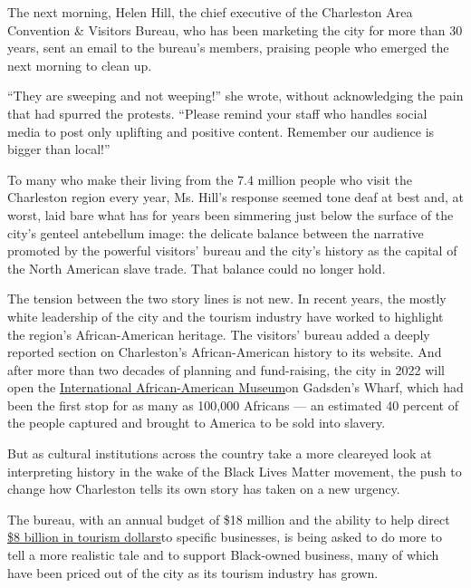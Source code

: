 The next morning, Helen Hill, the chief executive of the Charleston Area
Convention \& Visitors Bureau, who has been marketing the city for more
than 30 years, sent an email to the bureau's members, praising people
who emerged the next morning to clean up.

``They are sweeping and not weeping!'' she wrote, without acknowledging
the pain that had spurred the protests. ``Please remind your staff who
handles social media to post only uplifting and positive content.
Remember our audience is bigger than local!''

To many who make their living from the 7.4 million people who visit the
Charleston region every year, Ms. Hill's response seemed tone deaf at
best and, at worst, laid bare what has for years been simmering just
below the surface of the city's genteel antebellum image: the delicate
balance between the narrative promoted by the powerful visitors' bureau
and the city's history as the capital of the North American slave trade.
That balance could no longer hold.

The tension between the two story lines is not new. In recent years, the
mostly white leadership of the city and the tourism industry have worked
to highlight the region's African-American heritage. The visitors'
bureau added a deeply reported section on Charleston's African-American
history to its website. And after more than two decades of planning and
fund-raising, the city in 2022 will open the
\href{https://www.nytimes3xbfgragh.onion/2018/03/28/arts/charleston-international-african-american-museum.html}{International
African-American Museum}on Gadsden's Wharf, which had been the first
stop for as many as 100,000 Africans --- an estimated 40 percent of the
people captured and brought to America to be sold into slavery.

But as cultural institutions across the country take a more cleareyed
look at interpreting history in the wake of the Black Lives Matter
movement, the push to change how Charleston tells its own story has
taken on a new urgency.

The bureau, with an annual budget of \$18 million and the ability to
help direct
\href{https://www.postandcourier.com/business/visitors-to-charleston-broke-records-again-exceeding-7-2-million-last-year/article_7e0c7d14-57b0-11e9-a912-671dd61d9f4a.html}{\$8
billion in tourism dollars}to specific businesses, is being asked to do
more to tell a more realistic tale and to support Black-owned business,
many of which have been priced out of the city as its tourism industry
has grown.

